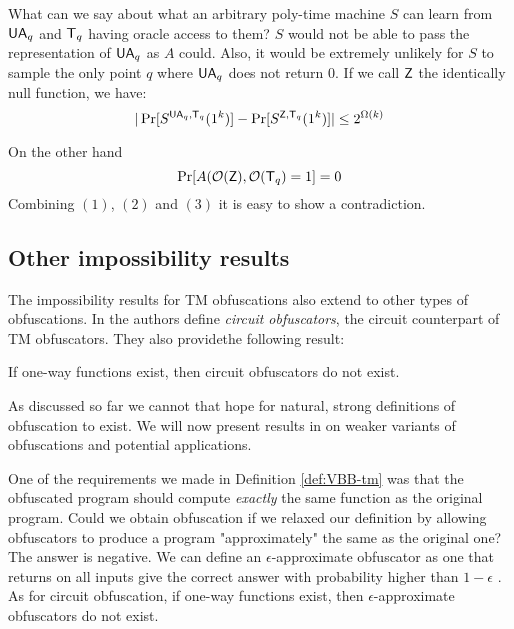 What can we say about what an arbitrary poly-time machine $S$ can learn from $\mathsf{UA}_q$ and $\mathsf{T}_q$ having oracle access to them? $S$ would not be able to pass the representation of $\mathsf{UA}_q$ as $A$ could. Also, it would be extremely unlikely for $S$ to sample the only point $q$ where $\mathsf{UA}_q$ does not return $0$. If we call $\mathsf{Z}$ the identically null function, we have:
\begin{equation} |\Pr[S^{\mathsf{UA}_q, \mathsf{T}_q}(1^k)] - \Pr[S^{\mathsf{Z}, \mathsf{T}_q}(1^k)]| \leq 2^{\Omega(k)}\end{equation}

On the other hand \begin{equation} \Pr[A(\mathcal{O}(\mathsf{Z}), \mathcal{O}(\mathsf{T}_q) = 1] = 0 \end{equation}
Combining $(1)$, $(2)$ and $(3)$ it is easy to show a contradiction.

\subsection{Other impossibility results}

The impossibility results for TM obfuscations also extend to other types of obfuscations.
In \cite{VBB-imp} the authors define \emph{circuit obfuscators}, the circuit counterpart of TM obfuscators. They also providethe following result:

\begin{mytheorem}
	If one-way functions exist, then circuit obfuscators do not exist.
\end{mytheorem}

As discussed so far we cannot that hope for natural, strong definitions of obfuscation to exist. We will now present results in \cite{VBB-imp} on weaker variants of obfuscations and potential applications.

One of the requirements we made in Definition \ref{def:VBB-tm} was that the obfuscated program should compute \emph{exactly} the same function as the original program. Could we obtain obfuscation if we relaxed our definition by allowing obfuscators to produce a program "approximately" the same as the original one?
The answer is negative. We can define an $\epsilon$-approximate obfuscator as one that returns on all inputs give the correct answer with probability higher than $1-\epsilon$ \cite{VBB-imp}. As for circuit obfuscation, if one-way functions exist, then $\epsilon$-approximate obfuscators do not exist.

